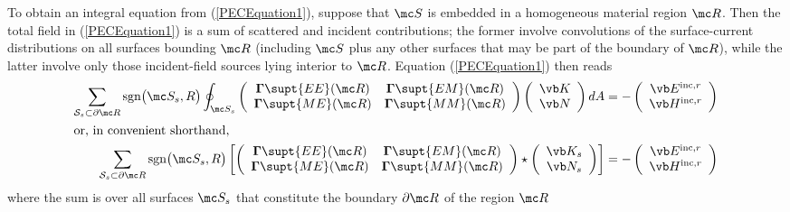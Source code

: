 To obtain an integral equation from (\ref{PECEquation1}), 
suppose that $\mc S$ is embedded in a homogeneous 
material region $\mc R$. 
Then the total field in (\ref{PECEquation1})
is a sum of scattered and incident contributions; 
the former involve convolutions of the surface-current
distributions on all surfaces bounding $\mc R$
(including $\mc S$ plus any other surfaces that 
may be part of the boundary of $\mc R$), while the 
latter involve only those incident-field sources
lying interior to $\mc R$. Equation (\ref{PECEquation1})
then reads
\begin{align}
   \sum_{\mathcal{S}_s \subset \partial \mc R}
   \text{sgn}\big(\mc S_s,R\big)
   \oint_{\mc S_s}
   \left(\begin{array}{cc}
   \BG\supt{EE}(\mc R) & \BG\supt{EM}(\mc R)  \\
   \BG\supt{ME}(\mc R) & \BG\supt{MM}(\mc R)  \\
   \end{array}\right)
   \left(\begin{array}{cc} \vb K \\ \vb N \end{array}\right)
   dA
  &=
  -
   \left(\begin{array}{c} \vb E\incr \\ \vb H\incr \end{array}\right)
\\
\intertext{or, in convenient shorthand,}
   \sum_{\mathcal{S}_s \subset \partial \mc R}
   \text{sgn}\big(\mc S_s,R\big)
   \left[ 
         \left(\begin{array}{cc}
         \BG\supt{EE}(\mc R) & \BG\supt{EM}(\mc R)  \\
         \BG\supt{ME}(\mc R) & \BG\supt{MM}(\mc R)  \\
         \end{array}\right) 
   \star 
   \left(\begin{array}{cc} \vb K_s \\ \vb N_s \end{array}\right)
   \right]
  &=
  -
   \left(\begin{array}{c} \vb E\incr \\ \vb H\incr \end{array}\right)
\label{EFIE}
\end{align}
where the sum is over all surfaces $\mc S_s$ that 
constitute the boundary $\partial \mc R$ of the region $\mc R$
